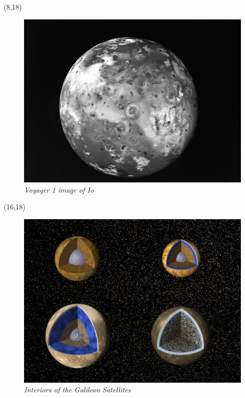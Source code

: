 \documentclass[lpsc]{lpscposter}
\begin{document}
\begin{textblock}{7}(8,18)
\begin{center}
\begin{figure}
\includegraphics[width=\textwidth]{vg1_Io}
	\caption{
	\scriptsize
	{\em Voyager 1 image of Io}
	\label{vg1io}
	}
\end{figure}
\end{center}
\end{textblock}


\begin{textblock}{7}(16,18)
\begin{center}
\begin{figure}
\includegraphics[width=\textwidth]{Galilean_sats_interiors}
	\caption{
	\scriptsize
	{\em Interiors of the Galilean Satellites}
	\label{galsats}
	}
\end{figure}
\end{center}
\end{textblock}
\end{document}
